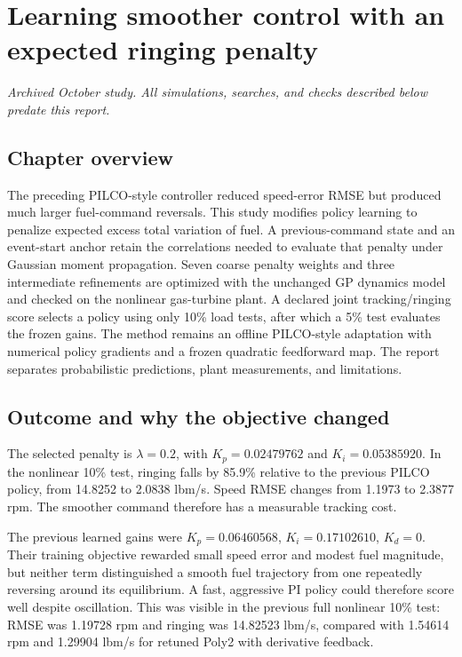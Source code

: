 \chapter{Learning smoother control with an expected ringing penalty}
\textit{Archived October study. All simulations, searches, and checks described below predate this report.}\par

\section*{Chapter overview}
The preceding PILCO-style controller reduced speed-error RMSE but produced much larger fuel-command reversals. This study modifies policy learning to penalize expected excess total variation of fuel. A previous-command state and an event-start anchor retain the correlations needed to evaluate that penalty under Gaussian moment propagation. Seven coarse penalty weights and three intermediate refinements are optimized with the unchanged GP dynamics model and checked on the nonlinear gas-turbine plant. A declared joint tracking/ringing score selects a policy using only 10\% load tests, after which a 5\% test evaluates the frozen gains. The method remains an offline PILCO-style adaptation with numerical policy gradients and a frozen quadratic feedforward map. The report separates probabilistic predictions, plant measurements, and limitations.

\section{Outcome and why the objective changed}
The selected penalty is $\lambda=0.2$, with $K_p=0.02479762$ and $K_i=0.05385920$. In the nonlinear 10\% test, ringing falls by 85.9\% relative to the previous PILCO policy, from 14.8252 to 2.0838 lbm/s. Speed RMSE changes from 1.1973 to 2.3877 rpm. The smoother command therefore has a measurable tracking cost.

The previous learned gains were $K_p=0.06460568$, $K_i=0.17102610$, $K_d=0$. Their training objective rewarded small speed error and modest fuel magnitude, but neither term distinguished a smooth fuel trajectory from one repeatedly reversing around its equilibrium. A fast, aggressive PI policy could therefore score well despite oscillation. This was visible in the previous full nonlinear 10\% test: RMSE was 1.19728 rpm and ringing was 14.82523 lbm/s, compared with 1.54614 rpm and 1.29904 lbm/s for retuned Poly2 with derivative feedback.


